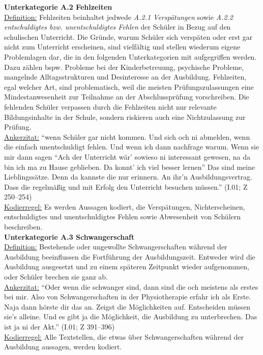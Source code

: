 \noindent
\textbf{Unterkategorie A.2 Fehlzeiten}\\
\underline{Definition:} Fehlzeiten beinhaltet jedwede \textit{A.2.1 Verspätungen} sowie \textit{A.2.2 entschuldigtes bzw. unentschuldigtes Fehlen} der Schüler in Bezug auf den schulischen Unterricht. Die Gründe, warum Schüler sich verspäten oder erst gar nicht zum Unterricht erscheinen, sind vielfältig und stellen wiederum eigene Problemlagen dar, die in den folgenden Unterkategorien mit aufgegriffen werden. Dazu zählen bspw. Probleme bei der Kinderbetreuung, psychische Probleme, mangelnde Alltagsstrukturen und Desinteresse an der Ausbildung. Fehlzeiten, egal welcher Art, sind problematisch, weil die meisten Prüfungszulassungen eine Mindestanwesenheit zur Teilnahme an der Abschlussprüfung vorschreiben. Die fehlenden Schüler verpassen durch die Fehlzeiten nicht nur relevante Bildungsinhalte in der Schule, sondern riskieren auch eine Nichtzulassung zur Prüfung.\\
\underline{Ankerzitat:} "`wenn Schüler gar nicht kommen. Und sich och ni abmelden, wenn die einfach unentschuldigt fehlen. Und wenn ich dann nachfrage warum. Wenn sie mir dann sagen "`Ach der Unterricht wär' sowieso ni interessant gewesen, na da bin ich ma zu Hause geblieben. Da konnt' ich viel besser lernen"' Das sind meine Lieblingssätze. Denn da kannste die nur erinnern. An ihr'n Ausbildungsvertrag. Dass die regelmäßig und mit Erfolg den Unterricht besuchen müssen."' (I.01; Z 250--254)\\
\underline{Kodierregel:} Es werden Aussagen kodiert, die Verspätungen, Nichterscheinen, entschuldigtes und unentschuldigtes Fehlen sowie Abwesenheit von Schülern beschreiben.\\

\noindent
\textbf{Unterkategorie A.3 Schwangerschaft}\\
\underline{Definition:} Bestehende oder ungewollte Schwangerschaften während der Ausbildung beeinflussen die Fortführung der Ausbildungszeit. Entweder wird die Ausbildung ausgesetzt und zu einem späteren Zeitpunkt wieder aufgenommen, oder Schüler brechen sie ganz ab.\\
\underline{Ankerzitat:} "`Oder wenn die schwanger sind, dann sind die och meistens als erstes bei mir. Also von Schwangerschaften in der Physiotherapie erfahr ich als Erste. Naja dann hörste dir das an. Zeigst die Möglichkeiten auf. Entscheiden müssen sie's alleine. Und es gibt ja die Möglichkeit, die Ausbildung zu unterbrechen. Das ist ja ni der Akt."' (I.01; Z 391--396)\\
\underline{Kodierregel:} Alle Textstellen, die etwas über Schwangerschaften während der Ausbildung aussagen, werden kodiert.\\

